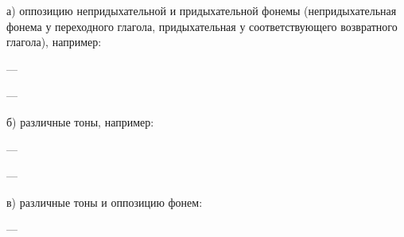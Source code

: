 а) оппозицию непридыхательной и придыхательной фонемы (непридыхательная фонема у переходного глагола, придыхательная у соответствующего возвратного глагола), например:
\begin{prfsample}
	\item {} --- 
	\item {} --- 
\end{prfsample}

б) различные тоны, например:
\begin{prfsample}
	\item {} --- 
	\item {} --- 
\end{prfsample}

в) различные тоны и оппозицию фонем:
\begin{prfsample}
	\item {} --- 
\end{prfsample}

